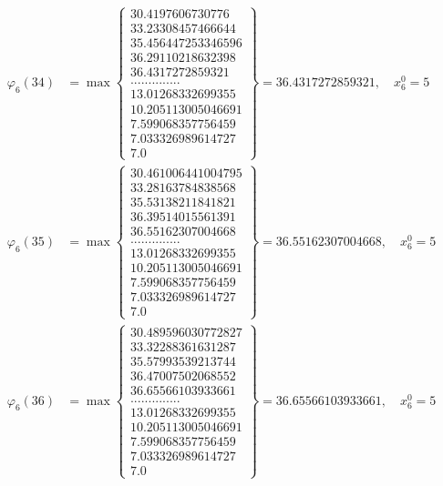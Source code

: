 \documentclass{article}
\begin{document}
\begin{align*}
  
  
  
\varphi_{6}(34) &= \max \left\{ \begin{array}{c}
30.4197606730776 \\
 33.23308457466644 \\
 35.456447253346596 \\
 36.29110218632398 \\
 36.4317272859321 \\
 .............. \\
 13.01268332699355 \\
 10.205113005046691 \\
 7.599068357756459 \\
 7.033326989614727 \\
 7.0
\end{array} \right\} = 36.4317272859321, \quad x_{6}^0 = 5\\
  
  
  
  
\varphi_{6}(35) &= \max \left\{ \begin{array}{c}
30.461006441004795 \\
 33.28163784838568 \\
 35.53138211841821 \\
 36.39514015561391 \\
 36.55162307004668 \\
 .............. \\
 13.01268332699355 \\
 10.205113005046691 \\
 7.599068357756459 \\
 7.033326989614727 \\
 7.0
\end{array} \right\} = 36.55162307004668, \quad x_{6}^0 = 5\\
  
  
  
  
\varphi_{6}(36) &= \max \left\{ \begin{array}{c}
30.489596030772827 \\
 33.32288361631287 \\
 35.57993539213744 \\
 36.47007502068552 \\
 36.65566103933661 \\
 .............. \\
 13.01268332699355 \\
 10.205113005046691 \\
 7.599068357756459 \\
 7.033326989614727 \\
 7.0
\end{array} \right\} = 36.65566103933661, \quad x_{6}^0 = 5\\
  
  
\end{align*}
\end{document}
